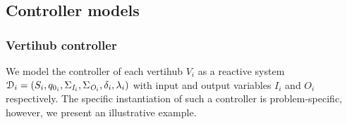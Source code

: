 \subsection{Controller models}
\subsubsection*{Vertihub controller}We model the controller of each vertihub $V_i$ as a reactive system $\mathcal{D}_i = (S_i,q_{0_i},\Sigma_{\textit{I}_{i}},\Sigma_{\textit{O}_{i}},\delta_{i},\lambda_{i})$ with input and output variables $I_i$ and $O_i$ respectively. The specific instantiation of such a controller is problem-specific, however, we present an illustrative example. 

